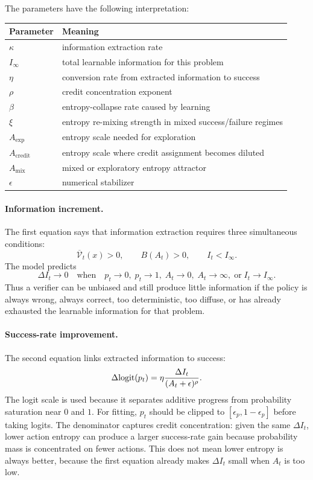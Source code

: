 The parameters have the following interpretation:
\begin{center}
\begin{tabular}{ll}
\toprule
Parameter & Meaning \\
\midrule
$\kappa$ & information extraction rate \\
$I_\infty$ & total learnable information for this problem \\
$\eta$ & conversion rate from extracted information to success \\
$\rho$ & credit concentration exponent \\
$\beta$ & entropy-collapse rate caused by learning \\
$\xi$ & entropy re-mixing strength in mixed success/failure regimes \\
$A_{\mathrm{exp}}$ & entropy scale needed for exploration \\
$A_{\mathrm{credit}}$ & entropy scale where credit assignment becomes diluted \\
$A_{\mathrm{mix}}$ & mixed or exploratory entropy attractor \\
$\epsilon$ & numerical stabilizer \\
\bottomrule
\end{tabular}
\end{center}

\paragraph{Information increment.}
The first equation says that information extraction requires three simultaneous conditions:
\[
  \overline{\mathcal{V}}_t(x)>0,\qquad B(A_t)>0,\qquad I_t<I_\infty.
\]
The model predicts
\[
  \Delta I_t\to 0
  \quad\text{when}\quad
  p_t\to 0,\; p_t\to 1,\; A_t\to 0,\; A_t\to\infty,\; \text{or}\; I_t\to I_\infty.
\]
Thus a verifier can be unbiased and still produce little information if the policy is always wrong, always correct, too deterministic, too diffuse, or has already exhausted the learnable information for that problem.

\paragraph{Success-rate improvement.}
The second equation links extracted information to success:
\[
  \Delta \mathrm{logit}(p_t)
  =
  \eta
  \frac{\Delta I_t}{(A_t+\epsilon)^\rho}.
\]
The logit scale is used because it separates additive progress from probability saturation near $0$ and $1$. For fitting, $p_t$ should be clipped to $[\epsilon_p,1-\epsilon_p]$ before taking logits. The denominator captures credit concentration: given the same $\Delta I_t$, lower action entropy can produce a larger success-rate gain because probability mass is concentrated on fewer actions. This does not mean lower entropy is always better, because the first equation already makes $\Delta I_t$ small when $A_t$ is too low.

